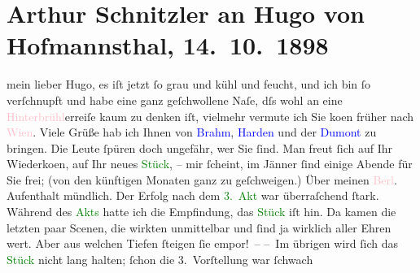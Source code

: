 
               \section[Arthur Schnitzler an Hugo von Hofmannsthal, 14. 10. 1898]{ Arthur Schnitzler an Hugo von Hofmannsthal,
                    14. 10. 1898}\nopagebreak{}\rehead{ }\normalsize\beginnumbering{} \toendnotes[C]{\smallbreak\pagebreak[2]} 
\toendnotes[C]{\smallbreak}\pstart
           \noindent{}{\pb}mein lieber Hugo, es iſt jetzt ſo grau und kühl und feucht, und
                    ich bin ſo verſchnupft und habe eine ganz geſchwollene Naſe, dſs wohl an eine
                        \textcolor{pink}{Hinterbrühl}erreiſe kaum zu denken iſt,
                    vielmehr vermute ich Sie ko{\geminationm}en früher nach \textcolor{pink}{Wien}. Viele Grüße hab ich Ihnen von \textcolor{blue}{Brahm}, \textcolor{blue}{Harden} und der \textcolor{blue}{Dumont} zu
                    bringen. Die Leute ſpüren doch ungefähr, wer Sie ſind. Man freut ſich auf Ihr
                        Wiederko{\geminationm}en, auf Ihr neues \textcolor{green}{Stück}, {\pb}– mir ſcheint, im Jänner{ }ſind einige Abende für Sie frei; (von
                    den künftigen Monaten ganz zu geſchweigen.)\pend
           \pstart
           Über meinen \textcolor{pink}{Berl}. Aufenthalt mündlich. Der
                    Erfolg nach dem \textcolor{green}{3. Akt}
                    war überraſchend ſtark. Während des \textcolor{green}{Akts} hatte ich die Empfindung, das \textcolor{green}{Stück} iſt hin. Da kamen die letzten
                    paar Scenen, die wirkten unmittelbar und ſind ja wirklich aller Ehren wert. Aber
                    aus welchen {\pb}Tiefen ſteigen ſie empor! –\pend
           \pstart
           – Im übrigen wird ſich das \textcolor{green}{Stück} nicht lang halten; ſchon die 3. Vorſtellung war ſchwach
